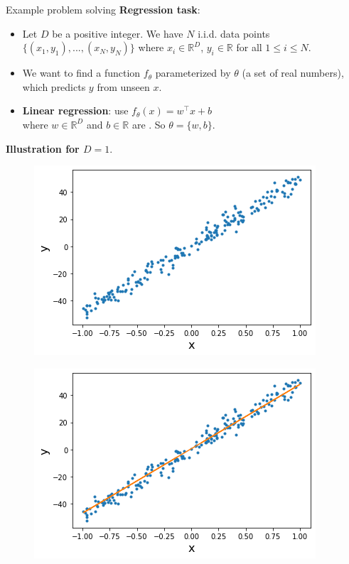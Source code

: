 \begin{frame}{Example problem solving}
\vspace{-3mm}
\textbf{Regression task}:
\vsp
\begin{itemize}
\item Let $D$ be a positive integer. We have $N$ i.i.d. data points $\{(x_1, y_1), ..., (x_N, y_N)\}$ where $x_i\in \mathbb{R}^D$, $y_i\in \mathbb{R}$ for all $1 \leq i \leq N$.\\
\item We want to find a function $f_{\theta}$ parameterized by $\theta$ (a set of real numbers), which predicts $y$ from unseen $x$.
\item \textbf{Linear regression}: use $f_{\theta}(x) = w^\intercal x + b$\\
where $w \in \mathbb{R}^D$ and $b \in \mathbb{R}$ are . So $\theta = \{w, b\}$.
\end{itemize}
\vsp \vsp
\textbf{Illustration for $D=1$}.\\
\vsp
\hspace{5mm}
\begin{minipage}{0.4\linewidth}
\begin{figure}
                        \centering
                        \includegraphics[width=.9\linewidth]{./figures/regression.png}
\end{figure}
\end{minipage}
\begin{minipage}{0.4\linewidth}
\begin{figure}
                        \centering
                        \includegraphics[width=.9\linewidth]{./figures/regression_example.png}

\end{figure}
\end{minipage}
\end{frame}
